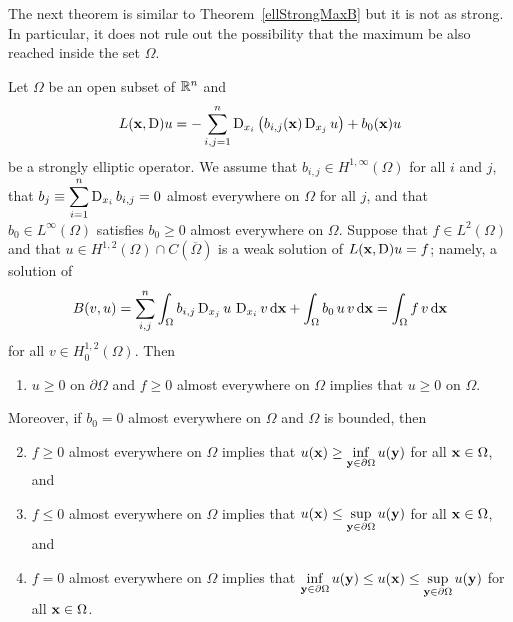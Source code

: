 The next theorem is similar to Theorem~\ref{ellStrongMaxB} but it is
not as strong.  In particular, it does not rule out the possibility
that the maximum be also reached inside the set $\Omega$.

\begin{theorem}
Let $\Omega$ be an open subset of $\mathbb{R}^n$ and
\[
L(\mathbf{x},\operatorname{D})u = - \sum_{i,j=1}^n
\operatorname{D}_{x_i} \left( b_{i,j}(\mathbf{x}) \operatorname{D}_{x_j} u \right)
+ b_0(\mathbf{x}) u
\]
be a strongly elliptic operator.  We assume that
$\displaystyle b_{i,j} \in H^{1,\infty}(\Omega)$ for all $i$ and $j$,
that $\displaystyle b_j \equiv \sum_{i=1}^n \operatorname{D}_{x_i} b_{i,j} = 0$
almost everywhere on $\Omega$ for all $j$, and that
$\displaystyle b_0 \in L^\infty(\Omega)$
satisfies $b_0 \geq 0$ almost everywhere on $\Omega$.  Suppose that
$\displaystyle f\in L^2(\Omega)$ and that
$\displaystyle u\in H^{1,2}(\Omega)\cap C(\overline{\Omega})$ is a
weak solution of $L(\mathbf{x},\operatorname{D})u=f$; namely, a solution of
\begin{equation} \label{ell_max_eq3}
B(v,u) = \sum_{i,j}^n
\int_\Omega b_{i,j} \operatorname{D}_{x_j} u \, \operatorname{D}_{x_i} v \,\mathrm{d}{\mathbf{x}} 
+ \int_\Omega b_0\, u \, v \,\mathrm{d}{\mathbf{x}} = \int_\Omega f\,v \,\mathrm{d}{\mathbf{x}}
\end{equation}
for all $\displaystyle v \in H^{1,2}_0(\Omega)$.  Then
\begin{enumerate}
\item $u\geq 0$ on $\partial \Omega$ and $f\geq 0$ almost everywhere on
$\Omega$ implies that $u\geq 0$ on $\Omega$.
\end{enumerate}
Moreover, if $b_0 = 0$ almost everywhere on $\Omega$ and $\Omega$ is
bounded, then
\begin{enumerate}
\setcounter{enumi}{1}
\item $f\geq 0$ almost everywhere on $\Omega$ implies that
$\displaystyle u(\mathbf{x}) \geq \inf_{\mathbf{y}\in \partial \Omega} u(\mathbf{y})$
for all $\mathbf{x} \in \Omega$, and
\item $f\leq 0$ almost everywhere on $\Omega$ implies that
$\displaystyle u(\mathbf{x}) \leq \sup_{\mathbf{y}\in \partial \Omega} u(\mathbf{y})$
for all $\mathbf{x} \in \Omega$, and
\item $f= 0$ almost everywhere on $\Omega$ implies that
$\displaystyle \inf_{\mathbf{y}\in \partial \Omega} u(\mathbf{y}) \leq u(\mathbf{x}) \leq
\sup_{\mathbf{y}\in \partial \Omega} u(\mathbf{y})$ for all $\mathbf{x} \in
\Omega$.
\end{enumerate}
\end{theorem}

